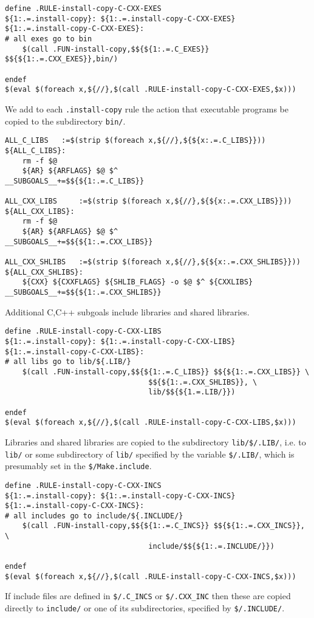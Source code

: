 \documentclass{article}
\begin{document}
\begin{verbatim}
define .RULE-install-copy-C-CXX-EXES
${1:.=.install-copy}: ${1:.=.install-copy-C-CXX-EXES}
${1:.=.install-copy-C-CXX-EXES}:
# all exes go to bin
	$(call .FUN-install-copy,$${${1:.=.C_EXES}} $${${1:.=.CXX_EXES}},bin/)

endef
$(eval $(foreach x,${//},$(call .RULE-install-copy-C-CXX-EXES,$x)))
\end{verbatim}
We add to each \verb+.install-copy+ rule the action that executable
programs be copied to the subdirectory \verb+bin/+.

\begin{verbatim}
ALL_C_LIBS   :=$(strip $(foreach x,${//},${${x:.=.C_LIBS}}))
${ALL_C_LIBS}:
	rm -f $@
	${AR} ${ARFLAGS} $@ $^
__SUBGOALS__+=$${${1:.=.C_LIBS}}

ALL_CXX_LIBS     :=$(strip $(foreach x,${//},${${x:.=.CXX_LIBS}}))
${ALL_CXX_LIBS}:
	rm -f $@
	${AR} ${ARFLAGS} $@ $^
__SUBGOALS__+=$${${1:.=.CXX_LIBS}}

ALL_CXX_SHLIBS   :=$(strip $(foreach x,${//},${${x:.=.CXX_SHLIBS}}))
${ALL_CXX_SHLIBS}:
	${CXX} ${CXXFLAGS} ${SHLIB_FLAGS} -o $@ $^ ${CXXLIBS}
__SUBGOALS__+=$${${1:.=.CXX_SHLIBS}}
\end{verbatim}
Additional C,C++ subgoals include libraries and shared libraries.

\begin{verbatim}
define .RULE-install-copy-C-CXX-LIBS
${1:.=.install-copy}: ${1:.=.install-copy-C-CXX-LIBS}
${1:.=.install-copy-C-CXX-LIBS}:
# all libs go to lib/${.LIB/}
	$(call .FUN-install-copy,$${${1:.=.C_LIBS}} $${${1:.=.CXX_LIBS}} \
                                 $${${1:.=.CXX_SHLIBS}}, \
                                 lib/$${${1.=.LIB/}})

endef
$(eval $(foreach x,${//},$(call .RULE-install-copy-C-CXX-LIBS,$x)))
\end{verbatim}
Libraries and shared libraries are copied to the subdirectory
\verb+lib/$/.LIB/+, i.e. to \verb+lib/+ or some subdirectory of
\verb+lib/+ specified by the  variable \verb+$/.LIB/+, which is
presumably set in the \verb+$/Make.include+.

\begin{verbatim}
define .RULE-install-copy-C-CXX-INCS
${1:.=.install-copy}: ${1:.=.install-copy-C-CXX-INCS}
${1:.=.install-copy-C-CXX-INCS}:
# all includes go to include/${.INCLUDE/}
	$(call .FUN-install-copy,$${${1:.=.C_INCS}} $${${1:.=.CXX_INCS}}, \
                                 include/$${${1:.=.INCLUDE/}})

endef
$(eval $(foreach x,${//},$(call .RULE-install-copy-C-CXX-INCS,$x)))
\end{verbatim}
If include files are defined in \verb+$/.C_INCS+ or \verb+$/.CXX_INC+
then these are copied directly to \verb+include/+ or one of its
subdirectories, specified by \verb+$/.INCLUDE/+.
\end{document}
